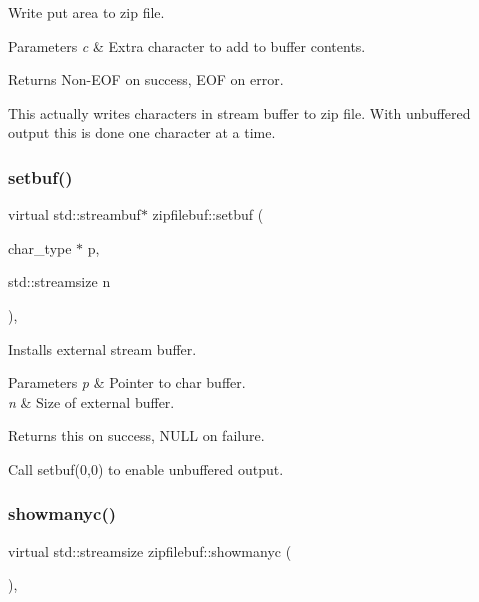 Write put area to zip file. 


\begin{DoxyParams}{Parameters}
{\em c} & Extra character to add to buffer contents. \\
\hline
\end{DoxyParams}
\begin{DoxyReturn}{Returns}
Non-\/\+E\+OF on success, E\+OF on error.
\end{DoxyReturn}
This actually writes characters in stream buffer to zip file. With unbuffered output this is done one character at a time. \mbox{\label{classzipfilebuf_a3b9b3c269535ed0d792c12c42506ccd4}} 
\subsubsection{\texorpdfstring{setbuf()}{setbuf()}}
{\footnotesize\ttfamily virtual std\+::streambuf$\ast$ zipfilebuf\+::setbuf (\begin{DoxyParamCaption}\item[{char\+\_\+type $\ast$}]{p,  }\item[{std\+::streamsize}]{n }\end{DoxyParamCaption})\hspace{0.3cm}{\ttfamily [protected]}, {\ttfamily [virtual]}}



Installs external stream buffer. 


\begin{DoxyParams}{Parameters}
{\em p} & Pointer to char buffer. \\
\hline
{\em n} & Size of external buffer. \\
\hline
\end{DoxyParams}
\begin{DoxyReturn}{Returns}
{\ttfamily this} on success, N\+U\+LL on failure.
\end{DoxyReturn}
Call setbuf(0,0) to enable unbuffered output. \mbox{\label{classzipfilebuf_ae3700c160ef70e63b08482a91b222ce1}} 
\subsubsection{\texorpdfstring{showmanyc()}{showmanyc()}}
{\footnotesize\ttfamily virtual std\+::streamsize zipfilebuf\+::showmanyc (\begin{DoxyParamCaption}{ }\end{DoxyParamCaption})\hspace{0.3cm}{\ttfamily [protected]}, {\ttfamily [virtual]}}



